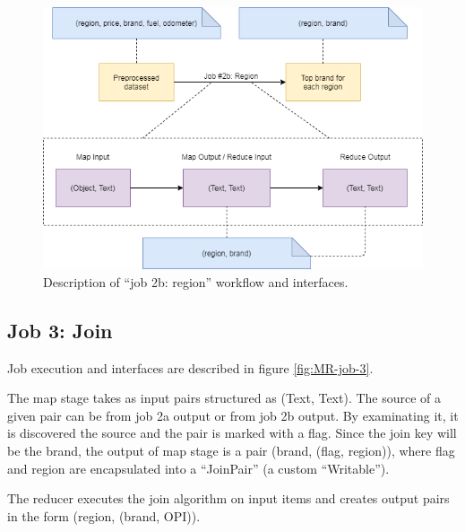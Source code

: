 \begin{figure}[H]
	\centering
	\includegraphics[scale=0.7]{images/2-mapreduce/MR-job-2b.png}
	\caption{Description of ``job 2b: region'' workflow and interfaces.}
	\label{fig:MR-job-2b}
\end{figure}  

\subsection{Job 3: Join}

Job execution and interfaces are described in figure \ref{fig:MR-job-3}.

The map stage takes as input pairs structured as (Text, Text). The source of a given pair can be from job 2a output or from job 2b output. By examinating it, it is discovered the source and the pair is marked with a flag.
Since the join key will be the brand, the output of map stage is a pair (brand, (flag, region)), where flag and region are encapsulated into a ``JoinPair'' (a custom ``Writable'').

The reducer executes the join algorithm on input items and creates output pairs in the form (region, (brand, OPI)). 

